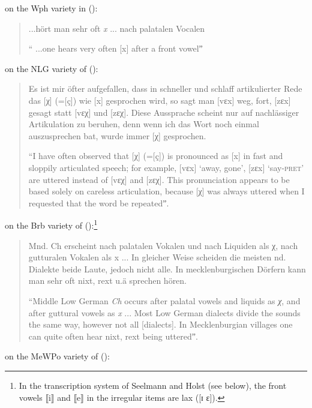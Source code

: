\citet[14]{Martin1925} on the Wph variety in  ():

\begin{quote} 
...hört man sehr oft \textit{x} ... nach palatalen Vocalen

  “ ...one hears very often [x] after a front vowelˮ
\end{quote}

\citet[23]{Kloeke1914} on the NLG variety of  ():

\begin{quote}
Es ist mir öfter aufgefallen, dass in schneller und schlaff artikulierter Rede das [χ] (=[ç]) wie [x] gesprochen wird, so sagt man [vɛx] weg, fort, [zɛx] gesagt statt [vɛχ] und [zɛχ]. Diese Aussprache scheint nur auf nachlässiger Artikulation zu beruhen, denn wenn ich das Wort noch einmal aus\-zu\-sprech\-en bat, wurde immer [χ] gesprochen.

“I have often observed that [χ] (=[ç]) is pronounced as [x] in fast and sloppily articulated speech; for example, [vɛx] ‘away, gone’, [zɛx] ‘say-\textsc{pret}’ are uttered instead of [vɛχ] and [zɛχ]. This pronunciation appears to be based solely on careless articulation, because [χ] was always uttered when I requested that the word be repeatedˮ.
\end{quote}

\citet[24]{Seelmann1908} on the Brb variety of  ():\footnote{{In the transcription system of Seelmann and Holst (see below), the front vowels ⟦i⟧ and ⟦e⟧ in the irregular items are lax ([ɪ ɛ]).}}

\begin{quote}
Mnd. Ch erscheint nach palatalen Vokalen und nach Liquiden als χ, nach gutturalen Vokalen als x ... In gleicher Weise scheiden die meisten nd. Dialekte beide Laute, jedoch nicht alle. In mecklenburgischen Dörfern kann man sehr oft nixt, rext u.ä sprechen hören.

  “Middle Low German \textit{Ch} occurs after palatal vowels and liquids as \textit{χ}, and after guttural vowels as \textit{x} ... Most Low German dialects divide the sounds the same way, however not all [dialects]. In Mecklenburgian villages one can quite often hear nixt, rext being utteredˮ.
\end{quote}

\citet[156]{Holst1907} on the MeWPo variety of  ():

